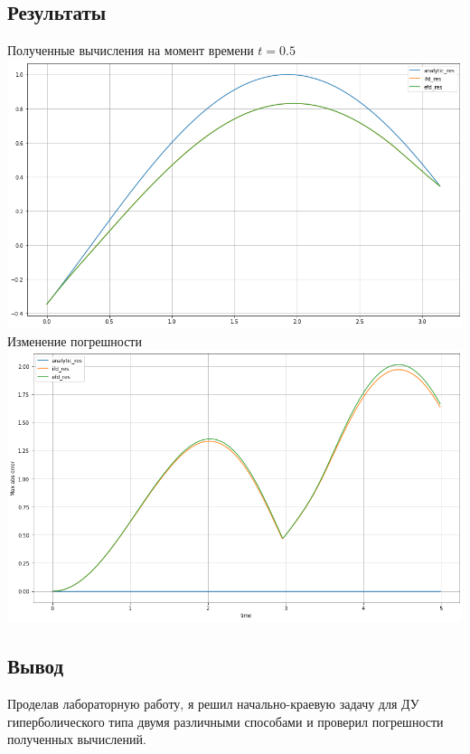 \documentclass{article}
\begin{document}
\subsection*{Результаты}
\begin{center}
Полученные вычисления на момент времени $ t = 0.5 $
\\
\includegraphics[scale=0.25]{img/img01.png}
\pagebreak
\\
Изменение погрешности
\\
\includegraphics[scale=0.25]{img/img02.png}
\end{center}

\subsection*{Вывод}
Проделав лабораторную работу, я решил начально-краевую задачу для ДУ 
гиперболического типа двумя различными способами и проверил погрешности 
полученных вычислений.
\end{document}
